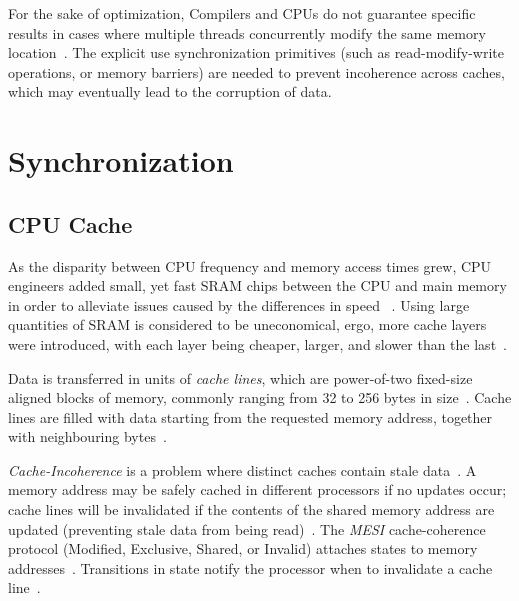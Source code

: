 For the sake of optimization, Compilers and CPUs do not guarantee specific
results in cases where multiple threads concurrently modify the same memory
location~\citep{drepper2007every}. The explicit use synchronization primitives
(such as read-modify-write operations, or memory barriers) are needed to
prevent incoherence across caches, which may eventually lead to the corruption
of data.

\pagebreak

\section{Synchronization}
\subsection{CPU Cache}
As the disparity between CPU frequency and memory access times grew, 
CPU engineers added small, yet fast SRAM chips between the CPU
and main memory in order to alleviate issues caused by the differences in speed
~\citep{cantrill2008real,drepper2007every,perfbook2021}. Using large
quantities of SRAM is considered to be uneconomical, ergo, more cache layers
were introduced, with each layer being cheaper, larger, and slower than the
last~\citep{drepper2007every,perfbook2021}.

Data is transferred in units of \emph{cache lines}, which are power-of-two
fixed-size aligned blocks of memory, commonly ranging from 32 to 256 bytes in
size~\citep{perfbook2021_cacheline}. Cache lines are filled with data
starting from the requested memory address, together with neighbouring bytes~\citep{perfbook2021_cacheline}.


\emph{Cache-Incoherence} is a problem where distinct caches contain stale
data~\citep{herlihy2020art_cachecoherence}. A memory address
may be safely cached in different processors if no updates occur; 
cache lines will be invalidated if the contents of the shared memory address are
updated (preventing stale data from being
read)~\citep{herlihy2020art_cachecoherence}.
The \emph{MESI} cache-coherence protocol (Modified, Exclusive, Shared, or
Invalid) attaches states to memory
addresses~\citep{herlihy2020art_cachecoherence}. Transitions in state notify
the processor when to invalidate a cache
line~\citep{herlihy2020art_cachecoherence}.


